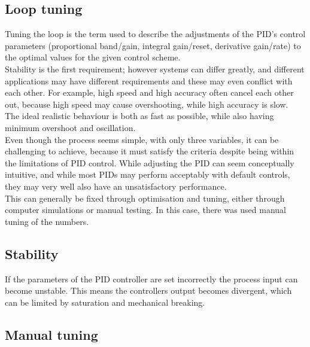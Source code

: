 \subsection {Loop tuning} 

Tuning the loop is the term used to describe the adjustments of the PID’s control parameters (proportional band/gain, integral gain/reset, derivative gain/rate) to the optimal values for the given control scheme. \\ Stability is the first requirement; however systems can differ greatly, and different applications may have different requirements and these may even conflict with each other. For example, high speed and high accuracy often cancel each other out, because high speed may cause overshooting, while high accuracy is slow.\\ The ideal realistic behaviour is both as fast as possible, while also having minimum overshoot and oscillation. \\ 

Even though the process seems simple, with only three variables, it can be challenging to achieve, because it must satisfy the criteria despite being within the limitations of PID control. While adjusting the PID can seem conceptually intuitive, and while most PIDs may perform acceptably with default controls, they may very well also have an unsatisfactory performance.\\ This can generally be fixed through optimisation and tuning, either through computer simulations or manual testing. In this case, there was used manual tuning of the numbers.

\subsection {Stability} 

If the parameters of the PID controller are set incorrectly the process input can become unstable.
This means the controllers output becomes divergent, which can be limited by saturation and mechanical breaking. \\

\subsection {Manual tuning} 

